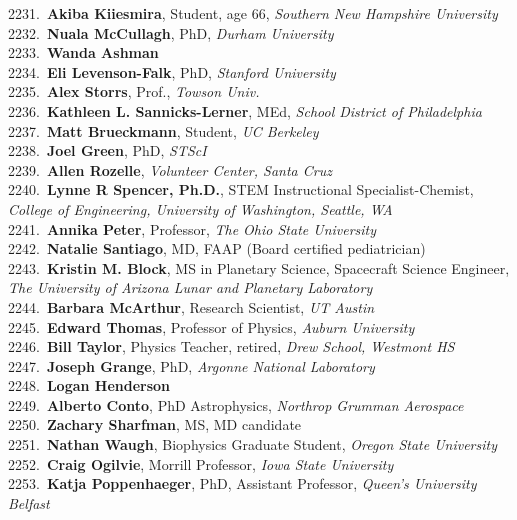 2231.~{\bf Akiba Kiiesmira}, Student, age 66, {\sl Southern New Hampshire University} \\
2232.~{\bf Nuala McCullagh}, PhD, {\sl Durham University} \\
2233.~{\bf Wanda Ashman} \\
2234.~{\bf Eli Levenson-Falk}, PhD, {\sl Stanford University} \\
2235.~{\bf Alex Storrs}, Prof., {\sl Towson Univ.} \\
2236.~{\bf Kathleen L. Sannicks-Lerner}, MEd, {\sl School District of Philadelphia} \\
2237.~{\bf Matt Brueckmann}, Student, {\sl UC Berkeley} \\
2238.~{\bf Joel Green}, PhD, {\sl STScI} \\
2239.~{\bf Allen Rozelle}, {\sl Volunteer Center, Santa Cruz} \\
2240.~{\bf Lynne R Spencer, Ph.D.}, STEM Instructional Specialist-Chemist, {\sl College of Engineering, University of Washington, Seattle, WA} \\
2241.~{\bf Annika Peter}, Professor, {\sl The Ohio State University} \\
2242.~{\bf Natalie Santiago}, MD, FAAP (Board certified pediatrician) \\
2243.~{\bf Kristin M. Block}, MS in Planetary Science, Spacecraft Science Engineer, {\sl The University of Arizona Lunar and Planetary Laboratory} \\
2244.~{\bf Barbara McArthur}, Research Scientist, {\sl UT Austin} \\
2245.~{\bf Edward Thomas}, Professor of Physics, {\sl Auburn University } \\
2246.~{\bf Bill Taylor}, Physics Teacher, retired, {\sl Drew School, Westmont HS} \\
2247.~{\bf Joseph Grange}, PhD, {\sl Argonne National Laboratory} \\
2248.~{\bf Logan Henderson} \\
2249.~{\bf Alberto Conto}, PhD Astrophysics, {\sl Northrop Grumman Aerospace} \\
2250.~{\bf Zachary Sharfman}, MS, MD candidate \\
2251.~{\bf Nathan Waugh}, Biophysics Graduate Student, {\sl Oregon State University} \\
2252.~{\bf Craig Ogilvie}, Morrill Professor, {\sl Iowa State University} \\
2253.~{\bf Katja Poppenhaeger}, PhD, Assistant Professor, {\sl Queen's University Belfast} \\
